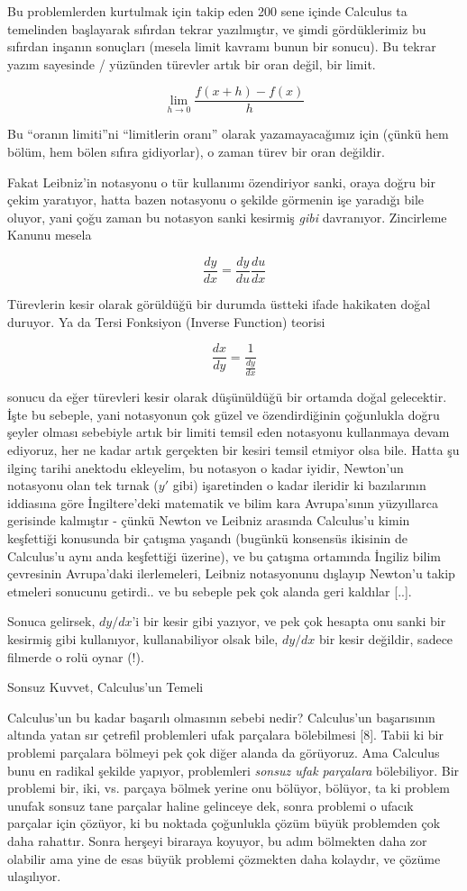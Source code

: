 \documentclass[12pt,fleqn]{article}\usepackage{../../common}
\begin{document}
Bu problemlerden kurtulmak için takip eden 200 sene içinde Calculus ta
temelinden başlayarak sıfırdan tekrar yazılmıştır, ve şimdi gördüklerimiz
bu sıfırdan inşanın sonuçları (mesela limit kavramı bunun bir sonucu). Bu
tekrar yazım sayesinde / yüzünden türevler artık bir oran değil, bir limit.

$$ \lim_{h \to 0} \frac{f(x+h) - f(x)}{h}$$

Bu ``oranın limiti''ni ``limitlerin oranı'' olarak yazamayacağımız için
(çünkü hem bölüm, hem bölen sıfıra gidiyorlar), o zaman türev bir oran
değildir.

Fakat Leibniz'in notasyonu o tür kullanımı özendiriyor sanki, oraya doğru bir
çekim yaratıyor, hatta bazen notasyonu o şekilde görmenin işe yaradığı bile
oluyor, yani çoğu zaman bu notasyon sanki kesirmiş {\em gibi}
davranıyor. Zincirleme Kanunu mesela

$$ \frac{dy}{dx} = \frac{dy}{du}\frac{du}{dx} $$

Türevlerin kesir olarak görüldüğü bir durumda üstteki ifade hakikaten doğal
duruyor. Ya da Tersi Fonksiyon (Inverse Function) teorisi

$$ \frac{dx}{dy} = \frac{1}{\frac{dy}{dx}} $$

sonucu da eğer türevleri kesir olarak düşünüldüğü bir ortamda doğal
gelecektir. İşte bu sebeple, yani notasyonun çok güzel ve özendirdiğinin
çoğunlukla doğru şeyler olması sebebiyle artık bir limiti temsil eden
notasyonu kullanmaya devam ediyoruz, her ne kadar artık gerçekten bir
kesiri temsil etmiyor olsa bile. Hatta şu ilginç tarihi anektodu ekleyelim,
bu notasyon o kadar iyidir, Newton'un notasyonu olan tek tırnak ($y'$ gibi)
işaretinden o kadar ileridir ki bazılarının iddiasına göre İngiltere'deki
matematik ve bilim kara Avrupa'sının yüzyıllarca gerisinde kalmıştır -
çünkü Newton ve Leibniz arasında Calculus'u kimin keşfettiği konusunda bir
çatışma yaşandı (bugünkü konsensüs ikisinin de Calculus'u aynı anda
keşfettiği üzerine), ve bu çatışma ortamında İngiliz bilim çevresinin
Avrupa'daki ilerlemeleri, Leibniz notasyonunu dışlayıp Newton'u takip
etmeleri sonucunu getirdi.. ve bu sebeple pek çok alanda geri kaldılar
[..].

Sonuca gelirsek, $dy/dx$'i bir kesir gibi yazıyor, ve pek çok hesapta onu
sanki bir kesirmiş gibi kullanıyor, kullanabiliyor olsak bile, $dy/dx$ bir
kesir değildir, sadece filmerde o rolü oynar (!).

Sonsuz Kuvvet, Calculus'un Temeli

Calculus'un bu kadar başarılı olmasının sebebi nedir? Calculus'un
başarısının altında yatan sır çetrefil problemleri ufak parçalara
bölebilmesi [8]. Tabii ki bir problemi parçalara bölmeyi pek çok diğer
alanda da görüyoruz. Ama Calculus bunu en radikal şekilde yapıyor,
problemleri {\em sonsuz ufak parçalara} bölebiliyor. Bir problemi bir, iki,
vs. parçaya bölmek yerine onu bölüyor, bölüyor, ta ki problem unufak sonsuz
tane parçalar haline gelinceye dek, sonra problemi o ufacık parçalar için
çözüyor, ki bu noktada çoğunlukla çözüm büyük problemden çok daha rahattır.
Sonra herşeyi biraraya koyuyor, bu adım bölmekten daha zor olabilir ama
yine de esas büyük problemi çözmekten daha kolaydır, ve çözüme ulaşılıyor.
\end{document}
